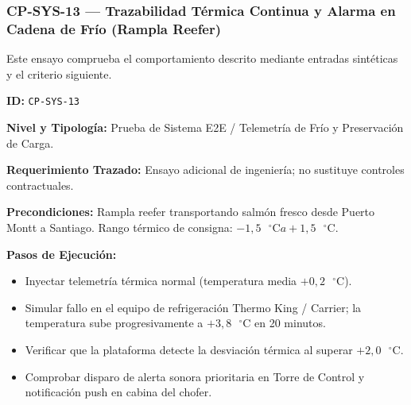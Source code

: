 \subsubsection*{CP-SYS-13 — Trazabilidad Térmica Continua y Alarma en Cadena de Frío (Rampla Reefer)}\label{sec:9-cp-sys-13}

Este ensayo comprueba el comportamiento descrito mediante entradas sintéticas y el criterio siguiente.

\par\noindent\textbf{ID:} \texttt{CP-\allowbreak{}SYS-\allowbreak{}13}\par
\par\noindent\textbf{Nivel y Tipología:} Prueba de Sistema E2E / Telemetría de Frío y Preservación de Carga.\par
\par\noindent\textbf{Requerimiento Trazado:} Ensayo adicional de ingeniería; no sustituye controles contractuales.\par
\par\noindent\textbf{Precondiciones:} Rampla reefer transportando salmón fresco desde Puerto Montt a Santiago. Rango térmico de consigna: \(-1{,}5\text{ }^\circ\text{C} a +1{,}5\text{ }^\circ\text{C}\).\par
\par\noindent\textbf{Pasos de Ejecución:}\par
\begin{itemize}
\item Inyectar telemetría térmica normal (temperatura media \(+0{,}2\text{ }^\circ\text{C}\)).
\item Simular fallo en el equipo de refrigeración Thermo King / Carrier; la temperatura sube progresivamente a \(+3{,}8\text{ }^\circ\text{C}\) en 20 minutos.
\item Verificar que la plataforma detecte la desviación térmica al superar \(+2{,}0\text{ }^\circ\text{C}\).
\item Comprobar disparo de alerta sonora prioritaria en Torre de Control y notificación push en cabina del chofer.
\end{itemize}

